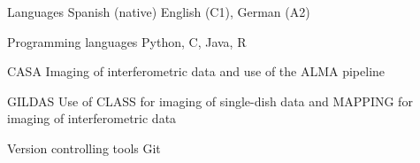 

\begin{cvskills}

  \cvskill
    {Languages} %
    {Spanish (native) English (C1), German (A2)} %
    

  \cvskill
    {Programming languages} %
    {Python, C, Java, R} %


  \cvskill
    {CASA} %
    {Imaging of interferometric data and use of the ALMA pipeline} %


  \cvskill
    {GILDAS} %
    {Use of CLASS for imaging of single-dish data and MAPPING for imaging of interferometric data} %


  \cvskill
    {Version controlling tools} %
    {Git} %


\end{cvskills}
